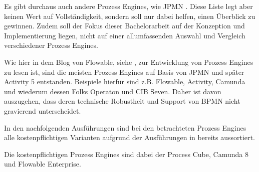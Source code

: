 Es gibt durchaus auch andere Prozess Engines, wie JPMN \citep{apache_software_foundation_jbpm_2024}. Diese Liste legt aber keinen Wert auf Vollständigkeit, sondern soll nur dabei helfen, einen Überblick zu gewinnen. Zudem soll der Fokus dieser Bachelorarbeit auf der Konzeption und Implementierung liegen, nicht auf einer allumfassenden Auswahl und Vergleich verschiedener Prozess Engines.

Wie hier in dem Blog von Flowable, siehe \cite{holmes-higgin_digital_2019}, zur Entwicklung von Prozess Engines zu lesen ist, sind die meisten Prozess Engines auf Basis von JPMN und später Activity 5 entstanden. Beispiele hierfür sind z.B. Flowable, Activity, Camunda und wiederum dessen Folks Operaton und CIB Seven. Daher ist davon auszugehen, dass deren technische Robustheit und Support von \ac{BPMN} nicht gravierend unterscheidet.

In den nachfolgenden Ausführungen sind bei den betrachteten Prozess Engines alle kostenpflichtigen Varianten aufgrund der Ausführungen in  bereits aussortiert. 

Die kostenpflichtigen Prozess Engines sind dabei der Process Cube, Camunda 8 und Flowable Enterprise.

